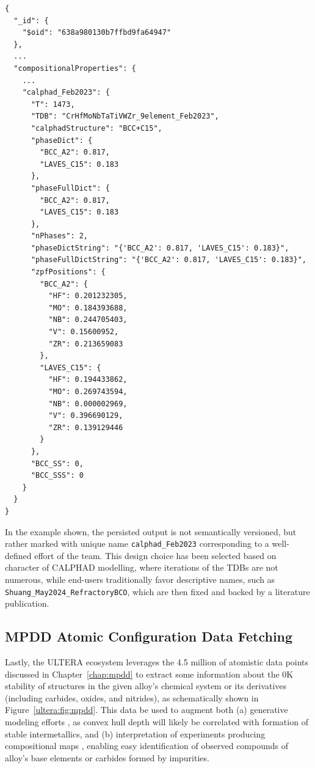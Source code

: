 \begin{verbatim}
{
  "_id": {
    "$oid": "638a980130b7ffbd9fa64947"
  },
  ...
  "compositionalProperties": {
    ...
    "calphad_Feb2023": {
      "T": 1473,
      "TDB": "CrHfMoNbTaTiVWZr_9element_Feb2023",
      "calphadStructure": "BCC+C15",
      "phaseDict": {
        "BCC_A2": 0.817,
        "LAVES_C15": 0.183
      },
      "phaseFullDict": {
        "BCC_A2": 0.817,
        "LAVES_C15": 0.183
      },
      "nPhases": 2,
      "phaseDictString": "{'BCC_A2': 0.817, 'LAVES_C15': 0.183}",
      "phaseFullDictString": "{'BCC_A2': 0.817, 'LAVES_C15': 0.183}",
      "zpfPositions": {
        "BCC_A2": {
          "HF": 0.201232305,
          "MO": 0.184393688,
          "NB": 0.244705403,
          "V": 0.15600952,
          "ZR": 0.213659083
        },
        "LAVES_C15": {
          "HF": 0.194433862,
          "MO": 0.269743594,
          "NB": 0.000002969,
          "V": 0.396690129,
          "ZR": 0.139129446
        }
      },
      "BCC_SS": 0,
      "BCC_SSS": 0
    }
  }
}
\end{verbatim}

In the example shown, the persisted output is not semantically versioned, but rather marked with unique name \texttt{calphad\_Feb2023} corresponding to a well-defined effort of the team. This design choice has been selected based on character of CALPHAD modelling, where iterations of the TDBs are not numerous, while end-users traditionally favor descriptive names, such as \texttt{Shuang\_May2024\_RefractoryBCO}, which are then fixed and backed by a literature publication.


\subsection{MPDD Atomic Configuration Data Fetching} \label{ultera:ssec:mpdd}

Lastly, the ULTERA ecosystem leverages the 4.5 million of atomistic data points discussed in Chapter~\ref{chap:mpdd} to extract some information about the 0K stability of structures in the given alloy's chemical system or its derivatives (including carbides, oxides, and nitrides), as schematically shown in Figure~\ref{ultera:fig:mpdd}. This data be used to augment both (a) generative modeling efforts \cite{Debnath2021GenerativeAlloys}, as convex hull depth will likely be correlated with formation of stable intermetallics, and (b) interpretation of experiments producing compositional maps \cite{Li2024DesignExperiments}, enabling easy identification of observed compounds of alloy's base elements or carbides formed by impurities. 


